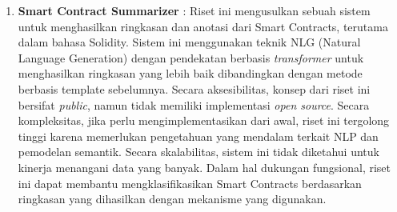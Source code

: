 \begin{enumerate}
	\item \textbf{Smart Contract Summarizer} \parencite{zhang2021smart}: Riset ini mengusulkan sebuah sistem untuk menghasilkan ringkasan dan anotasi dari Smart Contracts, terutama dalam bahasa Solidity. Sistem ini menggunakan teknik NLG (Natural Language Generation) dengan pendekatan berbasis \textit{transformer} untuk menghasilkan ringkasan yang lebih baik dibandingkan dengan metode berbasis template sebelumnya. Secara aksesibilitas, konsep dari riset ini bersifat \textit{public}, namun tidak memiliki implementasi \textit{open source}. Secara kompleksitas, jika perlu mengimplementasikan dari awal, riset ini tergolong tinggi karena memerlukan pengetahuan yang mendalam terkait NLP dan pemodelan semantik. Secara skalabilitas, sistem ini tidak diketahui untuk kinerja menangani data yang banyak. Dalam hal dukungan fungsional, riset ini dapat membantu mengklasifikasikan Smart Contracts berdasarkan ringkasan yang dihasilkan dengan mekanisme yang digunakan.

\end{enumerate}
